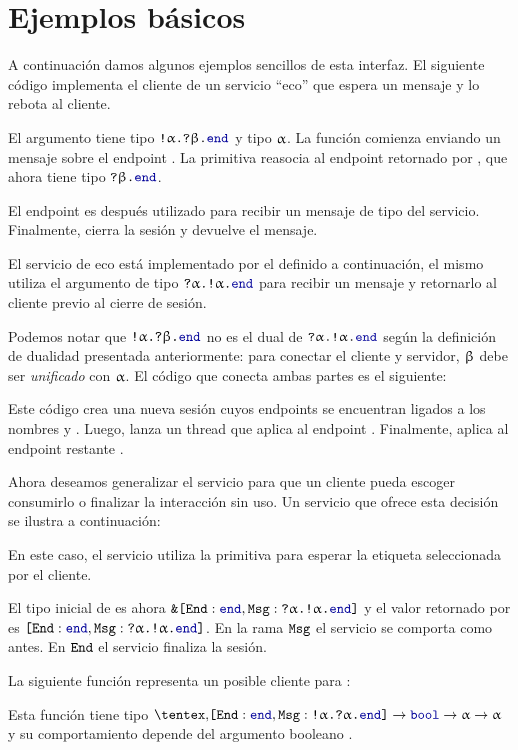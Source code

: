 \section{Ejemplos básicos}

A continuación damos algunos ejemplos sencillos de esta interfaz. El siguiente
código implementa el cliente de un servicio ``eco'' que espera un mensaje y
lo rebota al cliente.

\SimpleEchoClient

El argumento  tiene tipo $\Out\tvarA\In\tvarB\End$ y  tipo
$\tvarA$. La función  comienza enviando un mensaje  sobre
el endpoint . La primitiva  reasocia  al endpoint
retornado por , que ahora tiene tipo $\In\tvarB\End$.

El endpoint es después utilizado para recibir un mensaje de tipo  del
servicio. Finalmente,  cierra la sesión y devuelve el mensaje.


El servicio de eco está implementado por el  definido a
continuación, el mismo utiliza el argumento  de tipo
$\In\tvarA\Out\tvarA\End$ para recibir un mensaje  y retornarlo al
cliente previo al cierre de sesión.

\SimpleEchoService

Podemos notar que $\Out\tvarA\In\tvarB\End$ no es el dual de
$\In\tvar\Out\tvar\End$ según la definición de dualidad presentada
anteriormente: para conectar el cliente y servidor, $\tvarB$ debe ser
\emph{unificado} con $\tvarA$. El código que conecta ambas partes es el
siguiente:

\SimpleEchoMain

Este código crea una nueva sesión cuyos endpoints se encuentran ligados a los
nombres  y . Luego, lanza un thread que aplica  al
endpoint . Finalmente, aplica  al endpoint restante
.

Ahora deseamos generalizar el servicio para que un cliente pueda escoger
consumirlo o finalizar la interacción sin uso. Un servicio que ofrece esta
decisión se ilustra a continuación:

\OptionalEchoService

En este caso, el servicio utiliza la primitiva  para esperar la
etiqueta seleccionada por el cliente.

El tipo inicial de  es ahora $\Branch\set{\Tag[End] : \End, \Tag[Msg]
:\In\tvarA\Out\tvar\End}$ y el valor retornado por  es
$\set{\Tag[End] : \End, \Tag[Msg] :\In\tvarA\Out\tvar\End}$. En la rama
$\Tag[Msg]$ el servicio se comporta como antes. En $\Tag[End]$ el servicio
finaliza la sesión.

La siguiente función representa un posible cliente para :

\OptionalEchoClient

Esta función tiene tipo $\Choice\set{\Tag[End] : \End, \Tag[Msg] :
\Out\tvar\In\tvar\End} \to \tbool \to \tvar \to \tvar$ y su comportamiento depende del argumento booleano .
